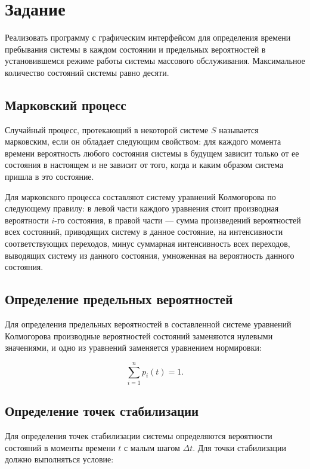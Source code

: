 \chapter{Задание}

Реализовать программу с графическим интерфейсом для определения времени пребывания системы в каждом состоянии и предельных вероятностей в установившемся режиме работы системы массового обслуживания. Максимальное количество состояний системы равно десяти.

\section{Марковский процесс}

Случайный процесс, протекающий в некоторой системе $S$ называется марковским, если он обладает следующим свойством: для каждого момента времени вероятность любого состояния системы в будущем зависит только от ее состояния в настоящем и не зависит от того, когда и каким образом система пришла в это состояние.

Для марковского процесса составляют систему уравнений Колмогорова по следующему правилу: в левой части каждого уравнения стоит производная вероятности $i$-го состояния, в правой части --- сумма произведений вероятностей всех состояний, приводящих систему в данное состояние, на интенсивности соответствующих переходов, минус суммарная интенсивность всех переходов, выводящих систему из данного состояния, умноженная на вероятность данного состояния.

\section{Определение предельных вероятностей}

Для определения предельных вероятностей в составленной системе уравнений Колмогорова производные вероятностей состояний заменяются нулевыми значениями, и одно из уравнений заменяется уравнением нормировки:

\begin{equation}
	\sum_{i = 1}^{n}p_{i}(t) = 1.
\end{equation} 

\section{Определение точек стабилизации}

Для определения точек стабилизации системы определяются вероятности состояний в моменты времени $t$ с малым шагом $\Delta t$. Для точки стабилизации должно выполняться условие:

